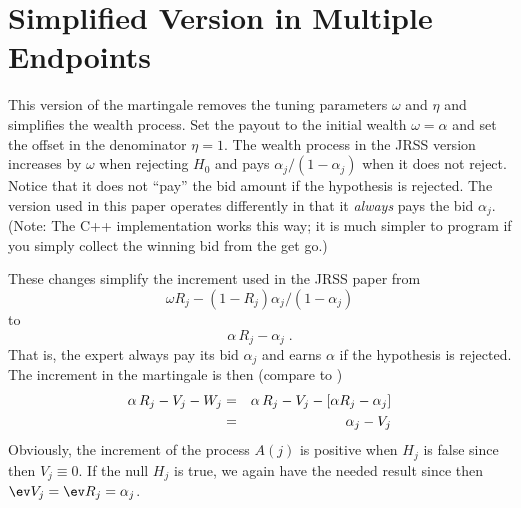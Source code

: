 \documentclass[12pt]{article}
\begin{document}
\section*{ Simplified Version in Multiple Endpoints }

 This version of the martingale removes the tuning parameters $\omega$ and
 $\eta$ and simplifies the wealth process.  Set the payout to the initial wealth
 $\omega = \alpha$ and set the offset in the denominator $\eta = 1$.  The wealth
 process in the JRSS version increases by $\omega$ when rejecting $H_0$ and pays
 $\alpha_j/(1-\alpha_j)$ when it does not reject.  Notice that it does not
 ``pay'' the bid amount if the hypothesis is rejected.  The version used in this
 paper operates differently in that it {\em always} pays the bid $\alpha_j$.
  (Note: The C++ implementation works this way; it is much simpler to program if
 you simply collect the winning bid from the get go.)


 These changes simplify the increment used in the JRSS paper from
 \begin{displaymath}
   \omega R_j - (1-R_j)\alpha_j/(1-\alpha_j)
 \end{displaymath}
 to
 \begin{displaymath}
  \alpha\, R_j - \alpha_j \;.   
 \end{displaymath}
 That is, the expert always pay its bid $\alpha_j$ and earns $\alpha$ if the
 hypothesis is rejected.  The increment in the martingale is then (compare to
 )
 \begin{eqnarray*}
   \alpha\,R_j - V_j - W_j 
    &=&  \alpha\,R_j - V_j - [\alpha R_j - \alpha_j] \cr
    &=& \alpha_j - V_j  
 \label{eq:increment3}
 \end{eqnarray*}
 Obviously, the increment of the process $A(j)$ is positive when $H_j$ is
 false since then $V_j \equiv 0$.  If the null $H_j$ is true, we again have the
 needed result since then $\ev V_j = \ev R_j = \alpha_j$.





\end{document}
